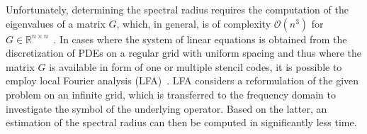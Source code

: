 Unfortunately, determining the spectral radius requires the computation of the eigenvalues of a matrix $G$, which, in general, is of complexity $\mathcal{O}(n^3)$ for $G \in \mathbb{R}^{n \times n}$~\cite{demmel2007fast}.
In cases where the system of linear equations is obtained from the discretization of PDEs on a regular grid with uniform spacing and thus where the matrix $G$ is available in form of one or multiple stencil codes, it is possible to employ local Fourier analysis (LFA)~\cite{wienands2004practical}.
LFA considers a reformulation of the given problem on an infinite grid, which is transferred to the frequency domain to investigate the symbol of the underlying operator.
Based on the latter, an estimation of the spectral radius can then be computed in significantly less time.




